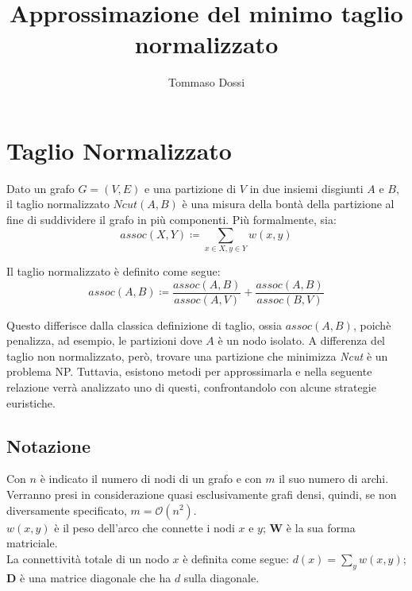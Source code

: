 \documentclass{article}
\title{Approssimazione del minimo taglio normalizzato}
\author{Tommaso Dossi}
\newcommand{\W}{\mathbf{W}}
\newcommand{\D}{\mathbf{D}}
\begin{document}
\maketitle


\section{Taglio Normalizzato}

Dato un grafo $G = (V,E)$ e una partizione di $V$ in due insiemi disgiunti $A$ e $B$,
il taglio normalizzato $Ncut(A,B)$ \`e una misura della bont\`a della partizione
al fine di suddividere il grafo in pi\`u componenti.
Pi\`u formalmente, sia:
\begin{equation*}
    assoc(X,Y) \coloneq \sum_{x \in X, y \in Y} w(x,y)
\end{equation*}

Il taglio normalizzato \`e definito come segue:
\begin{equation}
    assoc(A,B) \coloneq \frac{assoc(A,B)}{assoc(A,V)} + \frac{assoc(A,B)}{assoc(B,V)}
\end{equation}

Questo differisce dalla classica definizione di taglio, ossia $assoc(A,B)$, poich\`e penalizza, ad esempio,
le partizioni dove $A$ \`e un nodo isolato.
A differenza del taglio non normalizzato, per\`o, trovare una partizione che minimizza \textit{Ncut} \`e un problema NP.
Tuttavia, esistono metodi per approssimarla e nella seguente relazione verr\`a analizzato uno di questi, confrontandolo con alcune strategie euristiche.

\subsection{Notazione}
Con $n$ \`e indicato il numero di nodi di un grafo e con $m$ il suo numero di archi.\\
Verranno presi in considerazione quasi esclusivamente grafi densi, quindi, se non diversamente specificato, $m = \mathcal{O}(n^2)$.\\
$w(x,y)$ \`e il peso dell'arco che connette i nodi $x$ e $y$; $\W$ \`e la sua forma matriciale.\\
La connettivit\`a totale di un nodo $x$ \`e definita come segue: $d(x) = \sum_y w(x,y)$;
$\D$ \`e una matrice diagonale che ha $d$ sulla diagonale.
\end{document}
